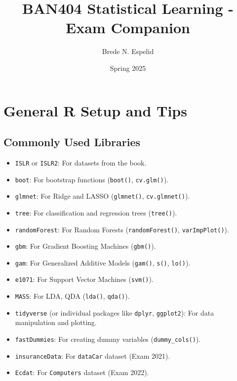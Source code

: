 \documentclass[12pt,a4paper]{article}
\title{BAN404 Statistical Learning - Exam Companion}
\author{Brede N. Espelid}
\date{Spring 2025}
\begin{document}
\maketitle
\tableofcontents
\newpage

\section{General R Setup and Tips}
\subsection{Commonly Used Libraries}
\begin{itemize}
    \item \texttt{ISLR} or \texttt{ISLR2}: For datasets from the book.
    \item \texttt{boot}: For bootstrap functions (\texttt{boot()}, \texttt{cv.glm()}).
    \item \texttt{glmnet}: For Ridge and LASSO (\texttt{glmnet()}, \texttt{cv.glmnet()}).
    \item \texttt{tree}: For classification and regression trees (\texttt{tree()}).
    \item \texttt{randomForest}: For Random Forests (\texttt{randomForest()}, \texttt{varImpPlot()}).
    \item \texttt{gbm}: For Gradient Boosting Machines (\texttt{gbm()}).
    \item \texttt{gam}: For Generalized Additive Models (\texttt{gam()}, \texttt{s()}, \texttt{lo()}).
    \item \texttt{e1071}: For Support Vector Machines (\texttt{svm()}).
    \item \texttt{MASS}: For LDA, QDA (\texttt{lda()}, \texttt{qda()}).
    \item \texttt{tidyverse} (or individual packages like \texttt{dplyr}, \texttt{ggplot2}): For data manipulation and plotting.
    \item \texttt{fastDummies}: For creating dummy variables (\texttt{dummy\_cols()}).
    \item \texttt{insuranceData}: For \texttt{dataCar} dataset (Exam 2021).
    \item \texttt{Ecdat}: For \texttt{Computers} dataset (Exam 2022).
\end{itemize}
\end{document}
